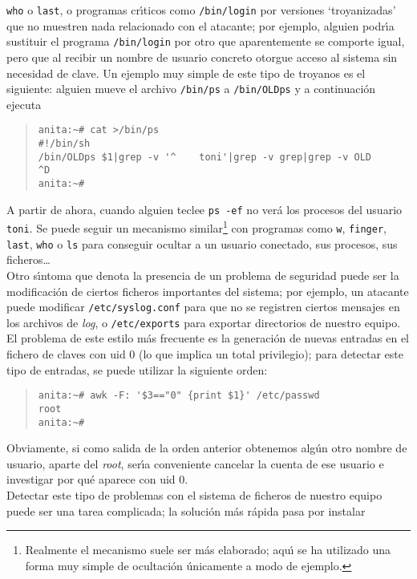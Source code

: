 \begin{itemize}
{\tt who} o {\tt last}, o programas cr\'{\i}ticos como {\tt /bin/login} por
versiones `troyanizadas' que no muestren nada relacionado con el atacante; por
ejemplo, alguien podr\'{\i}a sustituir el programa {\tt /bin/login} por otro
que aparentemente se comporte igual, pero que al recibir un nombre de usuario
concreto otorgue acceso al sistema sin necesidad de clave. Un ejemplo muy 
simple de este tipo de troyanos es el siguiente: alguien mueve el archivo 
{\tt /bin/ps} a {\tt /bin/OLDps} y a continuaci\'on ejecuta
\tt
\begin{quote}
\begin{verbatim}
anita:~# cat >/bin/ps
#!/bin/sh
/bin/OLDps $1|grep -v '^    toni'|grep -v grep|grep -v OLD
^D
anita:~#
\end{verbatim}
\end{quote}
\rm
A partir de ahora, cuando alguien teclee {\tt ps -ef} no ver\'a los procesos
del usuario {\tt toni}. Se puede seguir un mecanismo similar\footnote{Realmente
el mecanismo suele ser m\'as elaborado; aqu\'{\i} se ha utilizado una forma 
muy simple de ocultaci\'on \'unicamente a modo de ejemplo.} con programas como 
{\tt w}, {\tt finger}, {\tt last}, {\tt who} o {\tt ls} para conseguir ocultar
a un usuario conectado, sus procesos, sus ficheros\ldots\\ 
Otro s\'{\i}ntoma que denota la presencia de un problema de seguridad puede
ser la modificaci\'on de ciertos ficheros importantes del sistema; por ejemplo,
un atacante puede modificar {\tt /etc/syslog.conf} para que no se registren
ciertos mensajes en los archivos de {\it log}, o {\tt /etc/exports} para 
exportar directorios de nuestro equipo. El problema de este estilo m\'as 
frecuente es la generaci\'on de nuevas entradas en el fichero de claves con 
{\sc uid} 0 (lo que implica un total privilegio); para detectar este tipo de
entradas, se puede utilizar la siguiente orden: 
\tt
\begin{quote}
\begin{verbatim}
anita:~# awk -F: '$3=="0" {print $1}' /etc/passwd
root
anita:~#
\end{verbatim}
\end{quote}
\rm
Obviamente, si como salida de la orden anterior obtenemos alg\'un otro nombre
de usuario, aparte del {\it root}, ser\'{\i}a conveniente cancelar la cuenta
de ese usuario e investigar por qu\'e aparece con {\sc uid} 0.\\
Detectar este tipo de problemas con el sistema de ficheros de nuestro equipo 
puede ser una tarea complicada; la soluci\'on m\'as r\'apida pasa por instalar

\end{itemize}
